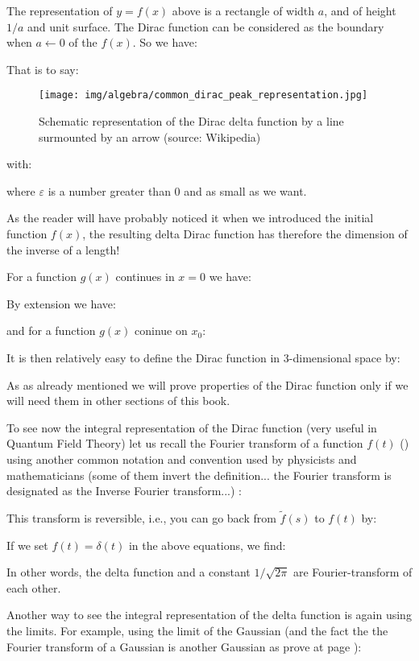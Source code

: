 	The representation of $y=f(x)$ above is a rectangle of width $a$, and of height $1/ a$ and unit surface. The Dirac function can be considered as the boundary when $a\leftarrow 0$ of the  $f (x)$. So we have:		
	
	That is to say:
	\begin{figure}[H]
		\centering
		\texttt{[image: img/algebra/common\_dirac\_peak\_representation.jpg]}
		\caption[Schematic representation of the Dirac delta function by a line surmounted by an arrow]{Schematic representation of the Dirac delta function by a line surmounted by an arrow (source: Wikipedia)}
	\end{figure}
	with:
	
	where $\varepsilon$ is a number greater than $0$ and as small as we want.
	\begin{tcolorbox}[title=Remark,colframe=black,arc=10pt]
		As the reader will have probably noticed it when we introduced the initial function $f (x)$, the resulting delta Dirac function has therefore the dimension of the inverse of a length!
	\end{tcolorbox}
	For a function $g (x)$ continues in $x = 0$ we have:
	
	By extension we have:
	
	and for a function $g (x)$ coninue on $x_0$:
	
	It is then relatively easy to define the Dirac function in 3-dimensional space by:
	
	As as already mentioned we will prove properties of the Dirac function only if we will need them in other sections of this book.
	
	To see now the integral representation of the Dirac function (very useful in Quantum Field Theory) let us recall the Fourier transform of a function $f(t)$ () using another common notation and convention used by physicists and mathematicians (some of them invert the definition... the Fourier transform is designated as the Inverse Fourier transform...) :
	
	This transform is reversible, i.e., you can go back from $\tilde{f}(s)$ to $f(t)$ by:
	
	If we set $f(t)=\delta(t)$ in the above equations, we find:
	
	In other words, the delta function and a constant $1 / \sqrt{2 \pi}$ are Fourier-transform of each other.
	
	Another way to see the integral representation of the delta function is again using the limits. For example, using the limit of the Gaussian (and the fact the the Fourier transform of a Gaussian is another Gaussian as prove at page \pageref{fourier transform gaussian function}):
	
